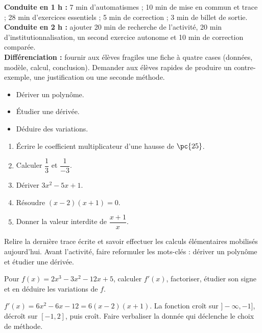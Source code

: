 \ifmxteacher
\begin{method}
\textbf{Conduite en 1 h :} 7 min d'automatismes ; 10 min de mise en commun et trace ; 28 min d'exercices essentiels ; 5 min de correction ; 3 min de billet de sortie.\\
\textbf{Conduite en 2 h :} ajouter 20 min de recherche de l'activité, 20 min d'institutionnalisation, un second exercice autonome et 10 min de correction comparée.\\
\textbf{Différenciation :} fournir aux élèves fragiles une fiche à quatre cases (données, modèle, calcul, conclusion). Demander aux élèves rapides de produire un contre-exemple, une justification ou une seconde méthode.
\end{method}
\fi
{}
\begin{objectives}\begin{itemize}\item Dériver un polynôme.\item Étudier une dérivée.\item Déduire des variations.\end{itemize}\end{objectives}
\begin{fluency}\begin{enumerate}\item Écrire le coefficient multiplicateur d'une hausse de $\pc{25}$. \item Calculer $\dfrac1{3}$ et $\dfrac1{-3}$. \item Dériver $3x^2-5x+1$. \item Résoudre $(x-2)(x+1)=0$. \item Donner la valeur interdite de $\dfrac{x+1}{x}$. \end{enumerate}\end{fluency}
\begin{prerequisites}Relire la dernière trace écrite et savoir effectuer les calculs élémentaires mobilisés aujourd'hui. Avant l'activité, faire reformuler les mots-clés : dériver un polynôme et étudier une dérivée.\end{prerequisites}

\begin{activity}
Pour $f(x)=2x^3-3x^2-12x+5$, calculer $f'(x)$, factoriser, étudier son signe et en déduire les variations de $f$.

\end{activity}
\begin{solution}$f'(x)=6x^2-6x-12=6(x-2)(x+1)$. La fonction croît sur $]-\infty,-1]$, décroît sur $[-1,2]$, puis croît. Faire verbaliser la donnée qui déclenche le choix de méthode.\end{solution}

